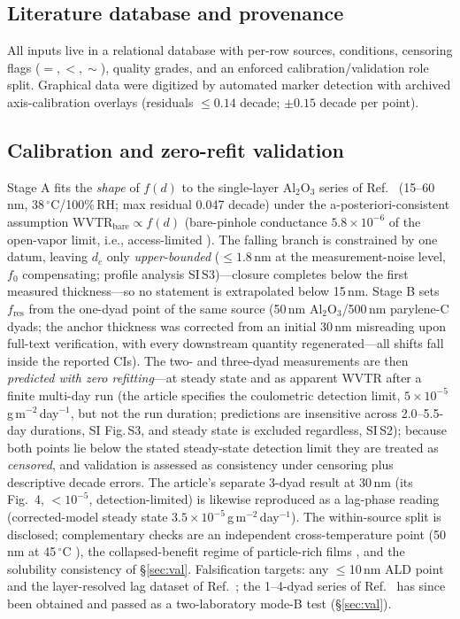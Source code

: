 \documentclass[11pt]{article}
\begin{document}
\subsection{Literature database and provenance}
All inputs live in a relational database with per-row sources, conditions, censoring flags ($=,<,\sim$), quality grades, and an enforced calibration/validation role split. Graphical data were digitized by automated marker detection with archived axis-calibration overlays (residuals $\le0.14$ decade; $\pm0.15$ decade per point).

\subsection{Calibration and zero-refit validation}\label{sec:cal}
Stage A fits the \emph{shape} of $f(d)$ to the single-layer Al$_2$O$_3$ series of Ref.~\cite{wu2018} (15--60\,nm, 38\,$^{\circ}$C/100\%\,RH; max residual 0.047 decade) under the a-posteriori-consistent assumption WVTR$_{\mathrm{bare}}\propto f(d)$ (bare-pinhole conductance $5.8\times10^{-6}$ of the open-vapor limit, i.e., access-limited \cite{rossi1993,dasilva2000}). The falling branch is constrained by one datum, leaving $d_c$ only \emph{upper-bounded} ($\le1.8$\,nm at the measurement-noise level, $f_0$ compensating; profile analysis SI\,S3)---closure completes below the first measured thickness---so no statement is extrapolated below 15\,nm. Stage B sets $f_{\mathrm{res}}$ from the one-dyad point of the same source (50\,nm Al$_2$O$_3$/500\,nm parylene-C dyads; the anchor thickness was corrected from an initial 30\,nm misreading upon full-text verification, with every downstream quantity regenerated---all shifts fall inside the reported CIs). The two- and three-dyad measurements are then \emph{predicted with zero refitting}---at steady state and as apparent WVTR after a finite multi-day run (the article specifies the coulometric detection limit, $5\times10^{-5}$\,g\,m$^{-2}$\,day$^{-1}$, but not the run duration; predictions are insensitive across 2.0--5.5-day durations, SI Fig.\,S3, and steady state is excluded regardless, SI\,S2); because both points lie below the stated steady-state detection limit they are treated as \emph{censored}, and validation is assessed as consistency under censoring plus descriptive decade errors. The article's separate 3-dyad result at 30\,nm (its Fig.~4, $<10^{-5}$, detection-limited) is likewise reproduced as a lag-phase reading (corrected-model steady state $3.5\times10^{-5}$\,g\,m$^{-2}$\,day$^{-1}$). The within-source split is disclosed; complementary checks are an independent cross-temperature point (50\,nm at 45\,$^{\circ}$C \cite{choi2018}), the collapsed-benefit regime of particle-rich films \cite{wu2018}, and the solubility consistency of \S\ref{sec:val}. Falsification targets: any $\le$10\,nm ALD point and the layer-resolved lag dataset of Ref.~\cite{kiese2019}; the 1--4-dyad series of Ref.~\cite{lee2018} has since been obtained and passed as a two-laboratory mode-B test (\S\ref{sec:val}).
\end{document}

